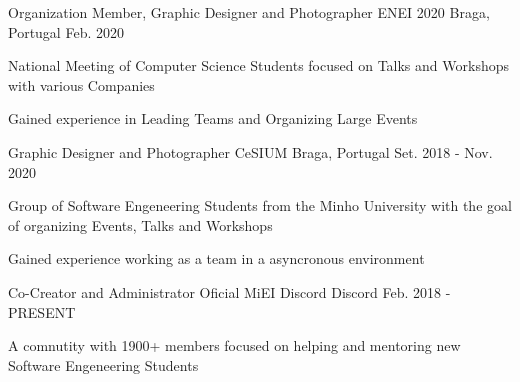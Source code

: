 
\begin{cventries}



\cventry
{Organization Member, Graphic Designer and Photographer} %
{ENEI 2020} %
{Braga, Portugal} %
{Feb. 2020} %
{ %
\begin{cvitems}
\item{National Meeting of Computer Science Students focused on Talks and
  Workshops with various Companies}
\item {Gained experience in Leading Teams and Organizing Large Events}
\end{cvitems}
}


\cventry
{Graphic Designer and Photographer} %
{CeSIUM} %
{Braga, Portugal} %
{Set. 2018 - Nov. 2020} %
{ %
\begin{cvitems}
\item {Group of Software Engeneering Students from the Minho University with the goal of
  organizing Events, Talks and Workshops}
\item {Gained experience working as a team in a asyncronous environment}
\end{cvitems}
}


\cventry
{Co-Creator and Administrator} %
{Oficial MiEI Discord} %
{Discord} %
{Feb. 2018 - PRESENT} %
{ %
\begin{cvitems}
\item {A comnutity with 1900+ members focused on helping and mentoring new
  Software Engeneering Students}
\end{cvitems}
}


\end{cventries}
